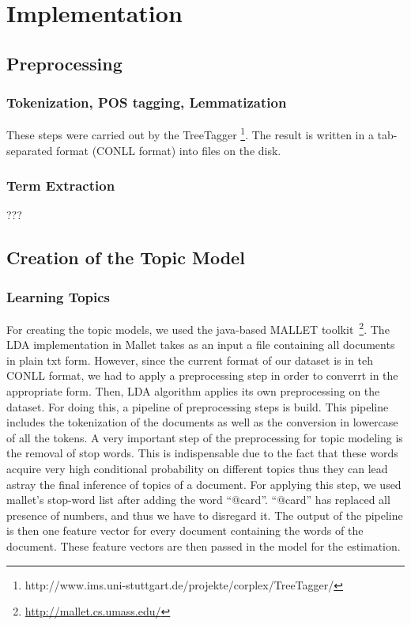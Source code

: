 \documentclass[11pt, a4paper, abstraction]{scrartcl}
\begin{document}
\section{Implementation}
\label{sec:implementation}

\subsection{Preprocessing}

\subsubsection{Tokenization, POS tagging, Lemmatization}
These steps were carried out by the TreeTagger \footnote{http://www.ims.uni-stuttgart.de/projekte/corplex/TreeTagger/}. The result is written in a tab-separated format (CONLL format) into files on the disk.

\subsubsection{Term Extraction}

???

\subsection{Creation of the Topic Model}

\subsubsection{Learning Topics}
For creating the topic models, we used the java-based MALLET toolkit~\footnote{\url{http://mallet.cs.umass.edu/}}. 
The LDA implementation in Mallet takes as an input a file containing all documents in plain txt form. However, since the current format of our dataset is in teh CONLL format, we had to apply a preprocessing step in order to converrt in the appropriate form.
Then, LDA algorithm applies its own preprocessing on the dataset. For doing this, a pipeline of preprocessing steps is build. This pipeline includes the tokenization of the documents as well as the conversion in lowercase of all the tokens.
A very important step of the preprocessing for topic modeling is the removal of stop words. This is indispensable due to the fact that these words acquire very high conditional probability on different topics thus they can lead astray the final inference of topics of a document. For applying this step, we used mallet's stop-word list after adding the word ``@card''. ``@card'' has replaced all presence of numbers, and thus we have to disregard it.
The output of the pipeline is then one feature vector for every document containing the words of the document.
These feature vectors are then passed in the model for the estimation. 
\end{document}
